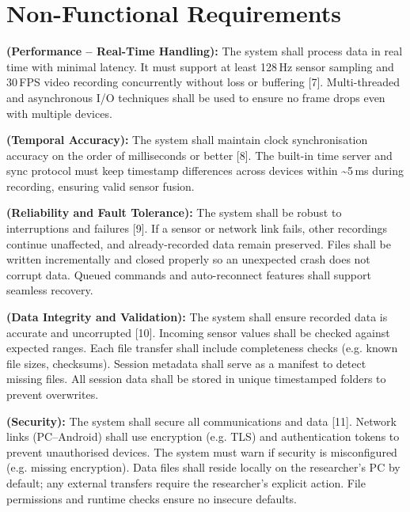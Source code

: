 \section{Non-Functional Requirements}

\begin{description}[style=unboxed,leftmargin=0cm]
	\item[\textbf{NFR1}] \textbf{(Performance – Real-Time Handling):} The system shall process data in real time with minimal latency. It must support at least 128\,Hz sensor sampling and 30\,FPS video recording concurrently without loss or buffering [7]. Multi-threaded and asynchronous I/O techniques shall be used to ensure no frame drops even with multiple devices.

	\item[\textbf{NFR2}] \textbf{(Temporal Accuracy):} The system shall maintain clock synchronisation accuracy on the order of milliseconds or better [8]. The built-in time server and sync protocol must keep timestamp differences across devices within \textasciitilde5\,ms during recording, ensuring valid sensor fusion.

	\item[\textbf{NFR3}] \textbf{(Reliability and Fault Tolerance):} The system shall be robust to interruptions and failures [9]. If a sensor or network link fails, other recordings continue unaffected, and already-recorded data remain preserved. Files shall be written incrementally and closed properly so an unexpected crash does not corrupt data. Queued commands and auto-reconnect features shall support seamless recovery.

	\item[\textbf{NFR4}] \textbf{(Data Integrity and Validation):} The system shall ensure recorded data is accurate and uncorrupted [10]. Incoming sensor values shall be checked against expected ranges. Each file transfer shall include completeness checks (e.g. known file sizes, checksums). Session metadata shall serve as a manifest to detect missing files. All session data shall be stored in unique timestamped folders to prevent overwrites.

	\item[\textbf{NFR5}] \textbf{(Security):} The system shall secure all communications and data [11]. Network links (PC–Android) shall use encryption (e.g. TLS) and authentication tokens to prevent unauthorised devices. The system must warn if security is misconfigured (e.g. missing encryption). Data files shall reside locally on the researcher’s PC by default; any external transfers require the researcher’s explicit action. File permissions and runtime checks ensure no insecure defaults.


\end{description}

